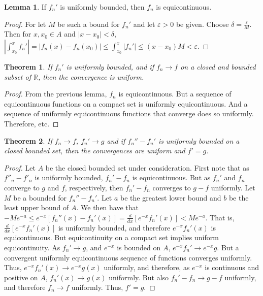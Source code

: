 \documentclass[oneside]{book}
\newtheorem{theorem}{Theorem}[section]
\theoremstyle{definition}
\newtheorem{lemma}{Lemma}[section]
\begin{document}
\begin{lemma}
If $f_n'$ is uniformly bounded, then $f_n$ is equicontinuous.
\end{lemma}
\begin{proof}
For let $M$ be such a bound for $f_n'$ and let $\varepsilon>0$ be given. Choose $\delta = \frac{\varepsilon}{M}$. Then for $x,x_0\in A$ and $|x-x_0|<\delta$, $|\int_{x_0}^{x}f_n'| =|f_n(x)-f_n(x_0)| \leq \int_{x_0}^{x}|f_n'| \leq (x-x_0)M < \varepsilon$.
\end{proof}

\begin{theorem}
If $f_n'$ is uniformly bounded, and if $f_n \rightarrow f$ on a closed and bounded subset of $\mathbb{R}$, then the convergence is uniform.
\end{theorem}
\begin{proof}
From the previous lemma, $f_n$ is equicontinuous. But a sequence of equicontinuous functions on a compact set is uniformly equicontinuous. And a sequence of uniformly equicontinuous functions that converge does so uniformly. Therefore, etc.
\end{proof}

\begin{theorem}
If $f_n \rightarrow f$, $f_n'\rightarrow g$ and if $f_n''-f_n'$ is uniformly bounded on a closed bounded set, then the convergences are uniform and $f' = g$.
\end{theorem}
\begin{proof}
Let $A$ be the closed bounded set under consideration. First note that as $f''_n - f'_n$ is uniformly bounded, $f_n'-f_n$ is equicontinuous. But as $f_n'$ and $f_n$ converge to $g$ and $f$, respectively, then $f_n'-f_n$ converges to $g-f$ uniformly. Let $M$ be a bounded for $f_n''-f_n'$. Let $a$ be the greatest lower bound and $b$ be the least upper bound of $A$. We then have that $-Me^{-a}\leq e^{-x}[f_n''(x)-f_n'(x)]=\frac{d}{dx}[e^{-x}f_n'(x)] < Me^{-a}$. That is, $\frac{d}{dx}[e^{-x}f_n'(x)]$ is uniformly bounded, and therefore $e^{-x}f_n'(x)$ is equicontinuous. But equicontinuity on a compact set implies uniform equicontinuity. As $f_n'\rightarrow g$, and $e^{-x}$ is bounded on $A$, $e^{-x}f_n'\rightarrow e^{-x}g$. But a convergent uniformly equicontinuous sequence of functions converges uniformly. Thus, $e^{-x}f_n'(x) \rightarrow e^{-x}g(x)$ uniformly, and therefore, as $e^{-x}$ is continuous and positive on $A$, $f_n'(x)\rightarrow g(x)$ uniformly. But also $f_n'-f_n \rightarrow g-f$ uniformly, and therefore $f_n \rightarrow f$ uniformly. Thus, $f'=g$.
\end{proof}
\end{document}
